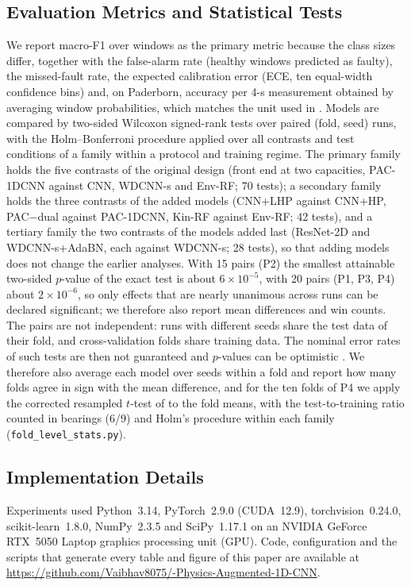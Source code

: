 \documentclass[conference]{IEEEtran}
\begin{document}
\subsection{Evaluation Metrics and Statistical Tests}
\label{sec:stats}
We report macro-F1 over windows as the primary metric because the class sizes differ, together with the false-alarm rate (healthy windows predicted as faulty), the missed-fault rate, the expected calibration error (ECE, ten equal-width confidence bins) \cite{guo2017calibration} and, on Paderborn, accuracy per 4-s measurement obtained by averaging window probabilities, which matches the unit used in \cite{lessmeier2016kat}. Models are compared by two-sided Wilcoxon signed-rank tests over paired (fold, seed) runs, with the Holm--Bonferroni procedure applied over all contrasts and test conditions of a family within a protocol and training regime. The primary family holds the five contrasts of the original design (front end at two capacities, PAC-1DCNN against CNN, WDCNN-s and Env-RF; 70 tests); a secondary family holds the three contrasts of the added models (CNN+LHP against CNN+HP, PAC$-$dual against PAC-1DCNN, Kin-RF against Env-RF; 42 tests), and a tertiary family the two contrasts of the models added last (ResNet-2D and WDCNN-s+AdaBN, each against WDCNN-s; 28 tests), so that adding models does not change the earlier analyses. With 15 pairs (P2) the smallest attainable two-sided $p$-value of the exact test is about $6\times10^{-5}$, with 20 pairs (P1, P3, P4) about $2\times10^{-6}$, so only effects that are nearly unanimous across runs can be declared significant; we therefore also report mean differences and win counts. The pairs are not independent: runs with different seeds share the test data of their fold, and cross-validation folds share training data. The nominal error rates of such tests are then not guaranteed and $p$-values can be optimistic \cite{nadeau2003}. We therefore also average each model over seeds within a fold and report how many folds agree in sign with the mean difference, and for the ten folds of P4 we apply the corrected resampled $t$-test of \cite{nadeau2003} to the fold means, with the test-to-training ratio counted in bearings (6/9) and Holm's procedure within each family (\texttt{fold\_level\_stats.py}).

\subsection{Implementation Details}
Experiments used Python~3.14, PyTorch~2.9.0 (CUDA~12.9), torchvision~0.24.0, scikit-learn~1.8.0, NumPy~2.3.5 and SciPy~1.17.1 on an NVIDIA GeForce RTX~5050 Laptop graphics processing unit (GPU). Code, configuration and the scripts that generate every table and figure of this paper are available at \url{https://github.com/Vaibhav8075/-Physics-Augmented-1D-CNN}.
\end{document}
